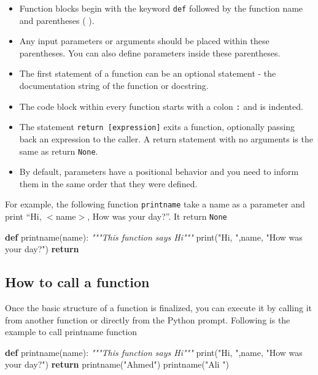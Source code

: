 \documentclass[11pt]{article}
\providecommand{\tightlist}{%
      \setlength{\itemsep}{0pt}\setlength{\parskip}{0pt}}
\newenvironment{Shaded}{}{}
\newcommand{\KeywordTok}[1]{\textcolor[rgb]{0.00,0.44,0.13}{\textbf{{#1}}}}
\newcommand{\StringTok}[1]{\textcolor[rgb]{0.25,0.44,0.63}{{#1}}}
\newcommand{\CommentTok}[1]{\textcolor[rgb]{0.38,0.63,0.69}{\textit{{#1}}}}
\newcommand{\NormalTok}[1]{{#1}}
\newcommand{\ControlFlowTok}[1]{\textcolor[rgb]{0.00,0.44,0.13}{\textbf{{#1}}}}
\newcommand{\BuiltInTok}[1]{{#1}}
\begin{document}
\begin{itemize}
\tightlist
\item
  Function blocks begin with the keyword \texttt{def} followed by the
  function name and parentheses ( ).
\item
  Any input parameters or arguments should be placed within these
  parentheses. You can also define parameters inside these parentheses.
\item
  The first statement of a function can be an optional statement - the
  documentation string of the function or docstring.
\item
  The code block within every function starts with a colon \texttt{:}
  and is indented.
\item
  The statement \texttt{return\ {[}expression{]}} exits a function,
  optionally passing back an expression to the caller. A return
  statement with no arguments is the same as return \texttt{None}.
\item
  By default, parameters have a positional behavior and you need to
  inform them in the same order that they were defined.
\end{itemize}

For example, the following function \texttt{printname} take a name as a
parameter and print ``Hi, \(<\)name\(>\), How was your day?''. It return
\texttt{None}

\begin{Shaded}
\begin{Highlighting}[]
    \KeywordTok{def}\NormalTok{ printname(name):}
        \CommentTok{"""This function says Hi"""}
        \BuiltInTok{print}\NormalTok{(}\StringTok{"Hi, "}\NormalTok{,name, }\StringTok{"How was your day?"}\NormalTok{)}
        \ControlFlowTok{return}
\end{Highlighting}
\end{Shaded}

\hypertarget{how-to-call-a-function}{%
\subsection{How to call a function}\label{how-to-call-a-function}}

Once the basic structure of a function is finalized, you can execute it
by calling it from another function or directly from the Python prompt.
Following is the example to call printname function

\begin{Shaded}
\begin{Highlighting}[]
\KeywordTok{def}\NormalTok{ printname(name):}
        \CommentTok{"""This function says Hi"""}
        \BuiltInTok{print}\NormalTok{(}\StringTok{"Hi, "}\NormalTok{,name, }\StringTok{"How was your day?"}\NormalTok{)}
        \ControlFlowTok{return}
\NormalTok{    printname(}\StringTok{"Ahmed"}\NormalTok{)}
\NormalTok{    printname(}\StringTok{"Ali  "}\NormalTok{)}
\end{Highlighting}
\end{Shaded}
\end{document}
